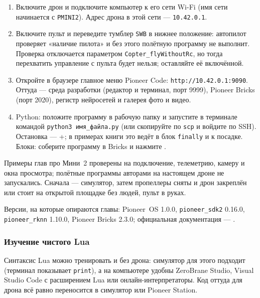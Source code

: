 \begin{enumerate}
    \item Включите дрон и подключите компьютер к его сети Wi-Fi (имя сети начинается с \texttt{PMINI2}). Адрес дрона в этой сети --- \texttt{10.42.0.1}.
    \item Включите пульт и переведите тумблер \texttt{SWB} в нижнее положение: автопилот проверяет «наличие пилота» и без этого полётную программу не выполнит. Проверка отключается параметром \texttt{Copter\_flyWithoutRc}, но тогда перехватить управление с пульта будет нельзя; оставляйте её включённой.
    \item Откройте в браузере главное меню Pioneer Code: \texttt{http://10.42.0.1:9090}. Оттуда --- среда разработки (редактор и терминал, порт 9999), Pioneer Bricks (порт 2020), регистр нейросетей и галерея фото и видео.
    \item Python: положите программу в рабочую папку и запустите в терминале командой \verb|python3 имя_файла.py| (или скопируйте по \texttt{scp} и войдите по SSH). Остановка --- +; в примерах книги это ведёт в блок \verb|finally| и к посадке. Блоки: соберите программу в Bricks и нажмите .
\end{enumerate}

\begin{alertbox}
Примеры глав про Мини~2 проверены на подключение, телеметрию, камеру и окна просмотра; полётные программы авторами на настоящем дроне не запускались. Сначала --- симулятор, затем пропеллеры сняты и дрон закреплён или стоит на открытой площадке без людей, пульт в руках.
\end{alertbox}

Версии, на которые опираются главы: Pioneer~OS 1.0.0, \texttt{pioneer\_sdk2} 0.16.0, \texttt{pioneer\_rknn} 1.10.0, Pioneer Bricks 2.3.0; официальная документация --- \cite{geoscan_mini2_sdk2, geoscan_mini2_rknn, geoscan_mini2_bricks}.

\subsubsection{Изучение чистого Lua}

Синтаксис Lua можно тренировать и без дрона: симулятор для этого подходит (терминал показывает \texttt{print}), а на компьютере удобны ZeroBrane Studio, Visual Studio Code с расширением Lua или онлайн-интерпретаторы. Код оттуда для дрона всё равно переносится в симулятор или Pioneer Station.

